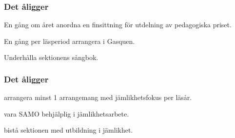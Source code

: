 \subsubsection{Det åligger \SEXIT}
\begin{att}
	\item En gång om året anordna en finsittning för utdelning av pedagogiska priset.
	\item En gång per läsperiod arrangera i Gasquen.
	\item Underhålla sektionens sångbok. 
\end{att}

\subsubsection{Det åligger \EQUALIT{}}
\begin{att}
    \item arrangera minst 1 arrangemang med jämlikhetsfokus per läsår.
    \item vara SAMO behjälplig i jämlikhetsarbete.
    \item bistå sektionen med utbildning i jämlikhet.
\end{att}

\begin{comment}

\newpage

\newpage

\newpage

\newpage

\newpage

\newpage

\newpage

\newpage

\end{comment}